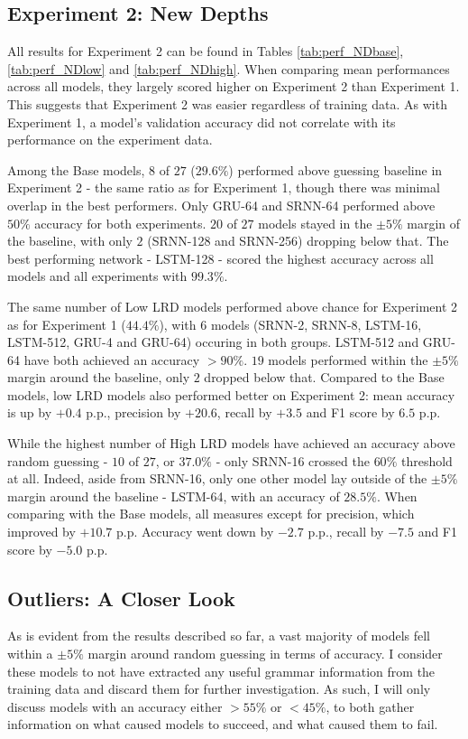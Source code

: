 \subsection{Experiment 2: New Depths}\label{resultsND}
All results for Experiment 2 can be found in Tables \ref{tab:perf_NDbase}, \ref{tab:perf_NDlow} and \ref{tab:perf_NDhigh}. When comparing mean performances across all models, they largely scored higher on Experiment 2 than Experiment 1. This suggests that Experiment 2 was easier regardless of training data. As with Experiment 1, a model's validation accuracy did not correlate with its performance on the experiment data.



Among the Base models, $8$ of $27$ ($29.6\%$) performed above guessing baseline in Experiment 2 - the same ratio as for Experiment 1, though there was minimal overlap in the best performers. Only GRU-64 and SRNN-64 performed above $50\%$ accuracy for both experiments. $20$ of $27$ models stayed in the $\pm 5\%$ margin of the baseline, with only $2$ (SRNN-128 and SRNN-256) dropping below that. The best performing network - LSTM-128 - scored the highest accuracy across all models and all experiments with $99.3\%$.



The same number of Low LRD models performed above chance for Experiment 2 as for Experiment 1 ($44.4\%$), with $6$ models (SRNN-2, SRNN-8, LSTM-16, LSTM-512, GRU-4 and GRU-64) occuring in both groups. LSTM-512 and GRU-64 have both achieved an accuracy $>90\%$. $19$ models performed within the $\pm 5\%$ margin around the baseline, only $2$ dropped below that. Compared to the Base models, low LRD models also performed better on Experiment 2: mean accuracy is up by $+0.4$ p.p., precision by $+20.6$, recall by $+3.5$ and F1 score by $6.5$ p.p.


While the highest number of High LRD models have achieved an accuracy above random guessing - $10$ of $27$, or $37.0\%$ - only SRNN-16 crossed the $60\%$ threshold at all. Indeed, aside from SRNN-16, only one other model lay outside of the $\pm 5\%$ margin around the baseline - LSTM-64, with an accuracy of $28.5\%$. When comparing with the Base models, all measures except for precision, which improved by $+10.7$ p.p. Accuracy went down by $-2.7$ p.p., recall by $-7.5$ and F1 score by $-5.0$ p.p.

\subsection{Outliers: A Closer Look}\label{results_outliers}
As is evident from the results described so far, a vast majority of models fell within a $\pm 5\%$ margin around random guessing in terms of accuracy. I consider these models to not have extracted any useful grammar information from the training data and discard them for further investigation. As such, I will only discuss models with an accuracy either $> 55\%$ or $< 45\%$, to both gather information on what caused models to succeed, and what caused them to fail.

